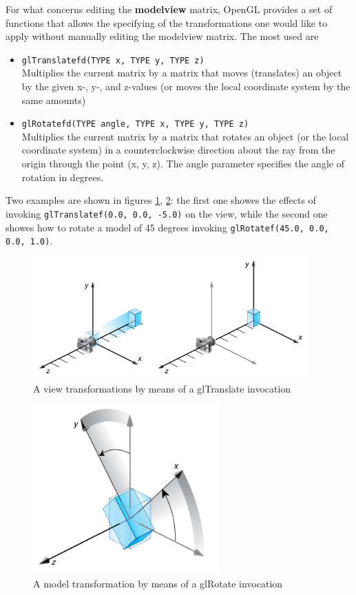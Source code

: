 %
For what concerns editing the \textbf{modelview} matrix, OpenGL 
provides a set of functions that allows the specifying of the 
transformations one would like to apply without manually 
editing the modelview matrix. The most used are 
%
\begin{itemize}
\item \texttt{glTranslate{fd}(TYPE x, TYPE y, TYPE z)}\\
  Multiplies the current matrix by a matrix that moves 
  (translates) an object by the given x-, y-, and z-values 
  (or moves the local coordinate system by the same amounts)

\item \texttt{glRotate{fd}(TYPE angle, TYPE x, TYPE y, TYPE z)} \\
  Multiplies the current matrix by a matrix that rotates an 
  object (or the   local coordinate system) in a counterclockwise 
  direction about the ray from the origin through the point 
  (x, y, z). The angle parameter specifies the angle of rotation in degrees.
\end{itemize}
Two examples are shown in figures \ref{fig:gltranslate}, \ref{fig:glrotate}:
the first one showes the effects of invoking \texttt{glTranslatef(0.0, 0.0, -5.0)} 
on the view, while the second one showes how to rotate a model of 45 degrees 
invoking \texttt{glRotatef(45.0, 0.0, 0.0, 1.0)}.
%
\begin{figure}[!h]
  \begin{center}
    \includegraphics[width=300pt]{img/gltranslate.png}
    \caption{A view transformations by means of a glTranslate invocation}
    \label{fig:gltranslate}
  \end{center}
\end{figure}
%
\begin{figure}[!h]
  \begin{center}
    \includegraphics[width=200pt]{img/glrotate.png}
    \caption{A model transformation by means of a glRotate invocation}
    \label{fig:glrotate}
  \end{center}
\end{figure}
%

